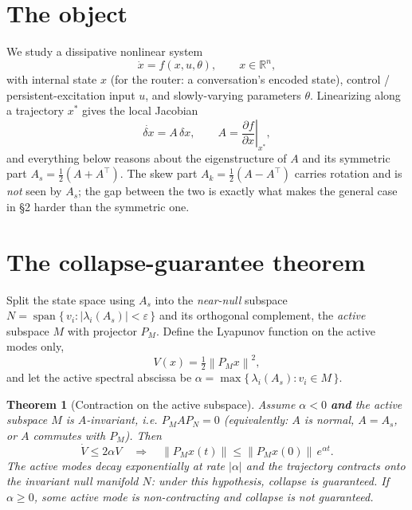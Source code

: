 \documentclass[11pt]{article}
\newtheorem{theorem}{Theorem}
\theoremstyle{definition}
\newcommand{\R}{\mathbb{R}}
\newcommand{\norm}[1]{\left\lVert#1\right\rVert}
\newcommand{\PM}{P_{\!M}}
\newcommand{\PN}{P_{\!N}}
\begin{document}
\section{The object}
We study a dissipative nonlinear system
\begin{equation}
\dot{x} = f(x,u,\theta), \qquad x \in \R^{n},
\end{equation}
with internal state $x$ (for the router: a conversation's encoded state),
control / persistent-excitation input $u$, and slowly-varying parameters $\theta$.
Linearizing along a trajectory $x^\ast$ gives the local Jacobian
\begin{equation}
\dot{\delta x} = A\,\delta x, \qquad
A = \left.\frac{\partial f}{\partial x}\right|_{x^\ast},
\end{equation}
and everything below reasons about the eigenstructure of $A$ and its symmetric
part $A_s = \tfrac12(A + A^{\top})$. The skew part $A_k=\tfrac12(A-A^\top)$ carries
rotation and is \emph{not} seen by $A_s$; the gap between the two is exactly what
makes the general case in \S2 harder than the symmetric one.

\section{The collapse-guarantee theorem}
Split the state space using $A_s$ into the \emph{near-null} subspace
$N = \operatorname{span}\{\, v_i : |\lambda_i(A_s)| < \varepsilon \,\}$ and its
orthogonal complement, the \emph{active} subspace $M$ with projector $\PM$. Define
the Lyapunov function on the active modes only,
\begin{equation}
V(x) = \tfrac12 \norm{\PM x}^2,
\end{equation}
and let the active spectral abscissa be
$\alpha = \max\{\, \lambda_i(A_s) : v_i \in M \,\}$.

\begin{theorem}[Contraction on the active subspace]
Assume $\alpha < 0$ \textbf{and} the active subspace $M$ is $A$-invariant, i.e.
$\PM A \PN = 0$ (equivalently: $A$ is normal, $A=A_s$, or $A$ commutes with $\PM$).
Then
\begin{equation}
\dot V \le 2\alpha V
\quad\Longrightarrow\quad
\norm{\PM x(t)} \le \norm{\PM x(0)}\, e^{\alpha t}.
\end{equation}
The active modes decay exponentially at rate $|\alpha|$ and the trajectory
contracts onto the invariant null manifold $N$: under this hypothesis, collapse is
guaranteed. If $\alpha \ge 0$, some active mode is non-contracting and collapse is
not guaranteed.
\end{theorem}
\end{document}
